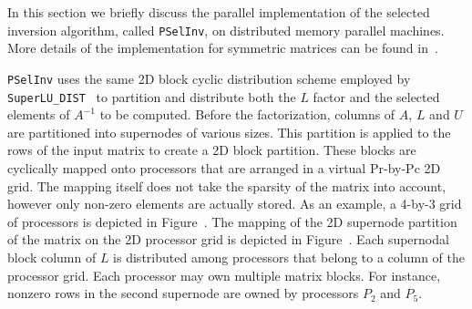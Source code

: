 \documentclass{acm_proc_article-sp}
\newcommand{\Lmat}{\ensuremath{L}\xspace}
\newcommand{\Proc}[1]{\ensuremath{P_{#1}}\xspace}
\newcommand{\pselinv}{\texttt{PSelInv}\xspace}
\newcommand{\superlu}{\texttt{SuperLU\_DIST}\xspace}
\begin{document}
In this section we briefly discuss the parallel implementation of the
selected inversion algorithm, called \texttt{PSelInv}, on distributed
memory parallel machines.  More details of the implementation for
symmetric matrices can be found in~\cite{JacquelinLinYang2014}.  

\pselinv uses the same 2D block cyclic distribution scheme 
employed by \superlu~\cite{LiDemmel2003} to partition and distribute both
the $L$ factor and the selected elements of $A^{-1}$ to 
be computed.
Before the factorization, columns of $A$, $L$ and $U$ are
partitioned into supernodes of various sizes.
This partition is applied to the rows of the input matrix to create
a 2D block partition. These blocks are cyclically mapped onto processors that are 
arranged in a virtual $\mathrm{Pr}$-by-$\mathrm{Pc}$ 2D grid.
The mapping itself does not take the sparsity of the matrix into account,
however only non-zero elements are actually stored.
As an example, a 4-by-3 grid of processors is depicted in
Figure~.  
The mapping of the 2D supernode partition of the matrix 
on the 2D processor grid is depicted in Figure~.
Each supernodal block column of \Lmat is distributed among processors
that belong to a column of the processor grid.  Each processor may own
multiple matrix blocks.  For instance, nonzero rows in the second 
supernode are owned by processors $\Proc{2}$ and $\Proc{5}$.
\end{document}
